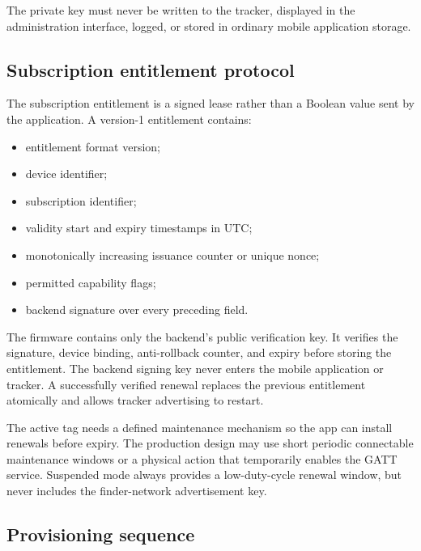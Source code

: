 \documentclass[12pt,a4paper]{article}
\begin{document}
The private key must never be written to the tracker, displayed in the
administration interface, logged, or stored in ordinary mobile application
storage.

\subsection{Subscription entitlement protocol}

The subscription entitlement is a signed lease rather than a Boolean value sent
by the application. A version-1 entitlement contains:

\begin{itemize}
    \item entitlement format version;
    \item device identifier;
    \item subscription identifier;
    \item validity start and expiry timestamps in UTC;
    \item monotonically increasing issuance counter or unique nonce;
    \item permitted capability flags;
    \item backend signature over every preceding field.
\end{itemize}

The firmware contains only the backend's public verification key. It verifies
the signature, device binding, anti-rollback counter, and expiry before storing
the entitlement. The backend signing key never enters the mobile application or
tracker. A successfully verified renewal replaces the previous entitlement
atomically and allows tracker advertising to restart.

The active tag needs a defined maintenance mechanism so the app can install
renewals before expiry. The production design may use short periodic
connectable maintenance windows or a physical action that temporarily enables
the GATT service. Suspended mode always provides a low-duty-cycle renewal
window, but never includes the finder-network advertisement key.

\subsection{Provisioning sequence}
\end{document}
